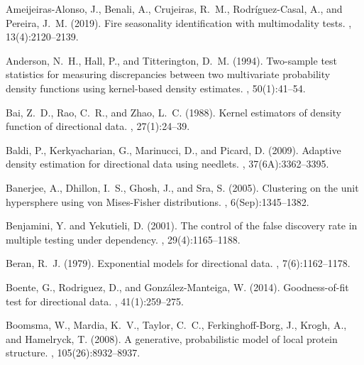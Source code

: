 \documentclass[oneside,11pt]{article}
\begin{document}
%
\begin{thebibliography}{}

	Ameijeiras-Alonso, J., Benali, A., Crujeiras, R.~M., Rodr\'{i}guez-Casal, A.,
	and Pereira, J.~M. (2019).
	\newblock Fire seasonality identification with multimodality tests.
	, 13(4):2120--2139.

	Anderson, N.~H., Hall, P., and Titterington, D.~M. (1994).
	\newblock Two-sample test statistics for measuring discrepancies between two
	multivariate probability density functions using kernel-based density
	estimates.
	, 50(1):41--54.

	Bai, Z.~D., Rao, C.~R., and Zhao, L.~C. (1988).
	\newblock Kernel estimators of density function of directional data.
	, 27(1):24--39.

	Baldi, P., Kerkyacharian, G., Marinucci, D., and Picard, D. (2009).
	\newblock Adaptive density estimation for directional data using needlets.
	, 37(6A):3362--3395.

	Banerjee, A., Dhillon, I.~S., Ghosh, J., and Sra, S. (2005).
	\newblock Clustering on the unit hypersphere using von {M}ises-{F}isher
	distributions.
	, 6(Sep):1345--1382.

	Benjamini, Y. and Yekutieli, D. (2001).
	\newblock The control of the false discovery rate in multiple testing under
	dependency.
	, 29(4):1165--1188.

	Beran, R.~J. (1979).
	\newblock Exponential models for directional data.
	, 7(6):1162--1178.

	Boente, G., Rodriguez, D., and Gonz\'alez-Manteiga, W. (2014).
	\newblock Goodness-of-fit test for directional data.
	, 41(1):259--275.

	Boomsma, W., Mardia, K.~V., Taylor, C.~C., Ferkinghoff-Borg, J., Krogh, A., and
	Hamelryck, T. (2008).
	\newblock A generative, probabilistic model of local protein structure.
	, 105(26):8932--8937.


\end{thebibliography}
\end{document}
